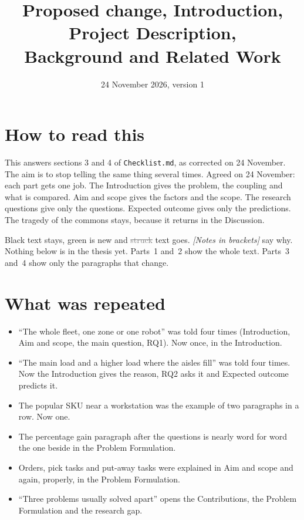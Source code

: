 \documentclass[11pt,a4paper]{article}
\title{Proposed change, Introduction, Project Description,\\ Background and Related Work}
\date{24 November 2026, version 1}
\newcommand{\new}[1]{\textcolor{newc}{#1}}
\newcommand{\old}[1]{\textcolor{gray}{\sout{#1}}}
\newcommand{\note}[1]{{\small\itshape [#1]}}
\newcommand{\lab}[1]{\textsf{\footnotesize\detokenize{#1}}}
\begin{document}
\sloppy
\maketitle

\section*{How to read this}
This answers sections 3 and 4 of \texttt{Checklist.md}, as corrected on
24 November. The aim is to stop telling the same thing several times.
Agreed on 24 November: each part gets one job. The Introduction gives the
problem, the coupling and what is compared. Aim and scope gives the factors
and the scope. The research questions give only the questions. Expected
outcome gives only the predictions. The tragedy of the commons stays,
because it returns in the Discussion.

Black text stays, \new{green} is new and \old{struck} text goes.
\note{Notes in brackets} say why. Nothing below is in the thesis yet.
Parts~1 and~2 show the whole text. Parts~3 and~4 show only the paragraphs
that change.

\section*{What was repeated}
\begin{itemize}[nosep]
  \item ``The whole fleet, one zone or one robot'' was told four times
    (Introduction, Aim and scope, the main question, RQ1). Now once, in the
    Introduction.
  \item ``The main load and a higher load where the aisles fill'' was told
    four times. Now the Introduction gives the reason, RQ2 asks it and
    Expected outcome predicts it.
  \item The popular SKU near a workstation was the example of two paragraphs
    in a row. Now one.
  \item The percentage gain paragraph after the questions is nearly word for
    word the one beside \lab{eq:relgain} in the Problem Formulation.
  \item Orders, pick tasks and put-away tasks were explained in Aim and scope
    and again, properly, in the Problem Formulation.
  \item ``Three problems usually solved apart'' opens the Contributions, the
    Problem Formulation and the research gap.
\end{itemize}
\end{document}
